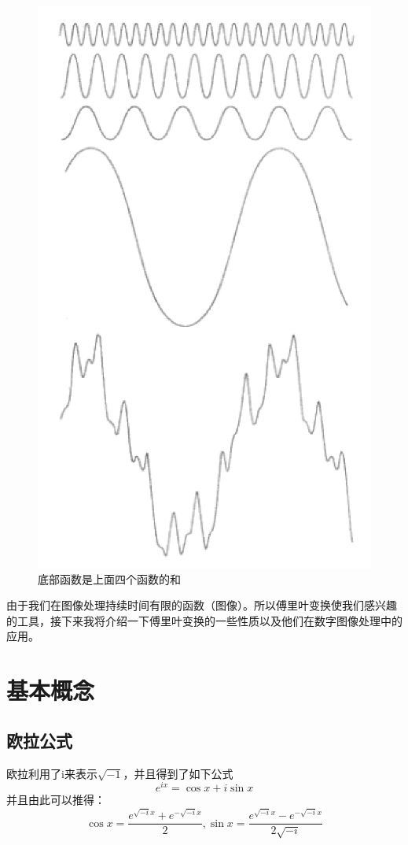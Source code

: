 \documentclass[UTF8,a4paper]{ctexart}
\begin{document}
 \begin{figure}[ht]
	\centering
	\includegraphics[scale=0.6]{pic1.png}
	\caption{底部函数是上面四个函数的和}
\end{figure}
由于我们在图像处理持续时间有限的函数（图像）。所以傅里叶变换使我们感兴趣的工具，接下来我将介绍一下傅里叶变换的一些性质以及他们在数字图像处理中的应用。
\section{基本概念}
\subsection{欧拉公式}
欧拉利用了i来表示$\sqrt{-1}$，并且得到了如下公式
\begin{equation}
e^{i x}=\cos x+i \sin x
\end{equation}
并且由此可以推得：
\begin{equation}
\cos x=\frac{e^{\sqrt{-i} x}+e^{-\sqrt{-i} x}}{2}, \sin x=\frac{e^{\sqrt{-i} x}-e^{-\sqrt{-i} x}}{2 \sqrt{-i}}
\end{equation}
\end{document}
